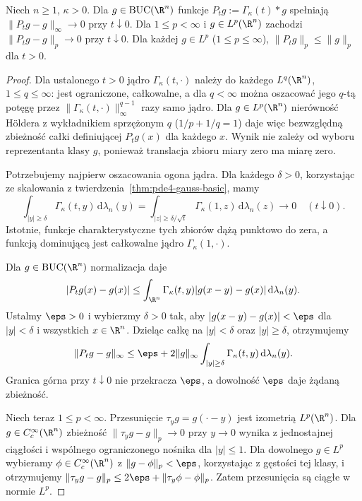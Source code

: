 \begin{twierdzenie}
\label{thm:pde4-approx-identity}
Niech $n\geq1$, $\kappa>0$. Dla $g\in\mathrm{BUC}(\R^n)$
funkcje $P_tg:=\Gamma_\kappa(t)*g$ spełniają
$\|P_tg-g\|_\infty\to0$ przy $t\downarrow0$.
Dla $1\leq p<\infty$ i $g\in L^p(\R^n)$ zachodzi
$\|P_tg-g\|_p\to0$ przy $t\downarrow0$.
Dla każdej $g\in L^p$ ($1\leq p\leq\infty$),
$\|P_tg\|_p\leq\|g\|_p$ dla $t>0$.
\end{twierdzenie}
\begin{proof}
Dla ustalonego $t>0$ jądro $\Gamma_\kappa(t,\cdot)$
należy do każdego $L^q(\R^n)$, $1\leq q\leq\infty$:
jest ograniczone, całkowalne, a dla $q<\infty$
można oszacować jego $q$-tą potęgę przez
$\|\Gamma_\kappa(t,\cdot)\|_\infty^{q-1}$
razy samo jądro. Dla $g\in L^p(\R^n)$
nierówność Höldera z wykładnikiem sprzężonym $q$
($1/p+1/q=1$) daje więc bezwzględną zbieżność
całki definiującej $P_tg(x)$ dla każdego $x$.
Wynik nie zależy od wyboru reprezentanta klasy $g$,
ponieważ translacja zbioru miary zero ma miarę zero.

Potrzebujemy najpierw oszacowania ogona jądra.
Dla każdego $\delta>0$, korzystając ze skalowania
z twierdzenia~\ref{thm:pde4-gauss-basic}, mamy
\[
 \int_{|y|\geq\delta}\Gamma_\kappa(t,y)\,
 \mathrm d\lambda_n(y)
 =\int_{|z|\geq\delta/\sqrt t}\Gamma_\kappa(1,z)\,
 \mathrm d\lambda_n(z)\longrightarrow0
 \quad(t\downarrow0).
\]
Istotnie, funkcje charakterystyczne tych zbiorów
dążą punktowo do zera, a funkcją dominującą
jest całkowalne jądro $\Gamma_\kappa(1,\cdot)$.

Dla $g\in\mathrm{BUC}(\R^n)$ normalizacja daje
\[
 |P_tg(x)-g(x)|\leq
 \int_{\R^n}\Gamma_\kappa(t,y)|g(x-y)-g(x)|
 \,\mathrm d\lambda_n(y).
\]
Ustalmy $\eps>0$ i wybierzmy $\delta>0$ tak,
aby $|g(x-y)-g(x)|<\eps$ dla $|y|<\delta$
i wszystkich $x\in\R^n$. Dzieląc całkę na
$|y|<\delta$ oraz $|y|\geq\delta$, otrzymujemy
\[
 \|P_tg-g\|_\infty\leq\eps+
 2\|g\|_\infty\int_{|y|\geq\delta}\Gamma_\kappa(t,y)
 \,\mathrm d\lambda_n(y).
\]
Granica górna przy $t\downarrow0$ nie przekracza
$\eps$, a dowolność $\eps$ daje żądaną zbieżność.

Niech teraz $1\leq p<\infty$. Przesunięcie
$\tau_yg=g(\cdot-y)$ jest izometrią $L^p(\R^n)$.
Dla $g\in C_c^\infty(\R^n)$ zbieżność
$\|\tau_yg-g\|_p\to0$ przy $y\to0$ wynika
z jednostajnej ciągłości i wspólnego ograniczonego
nośnika dla $|y|\leq1$.
Dla dowolnego $g\in L^p$ wybieramy
$\phi\in C_c^\infty(\R^n)$ z $\|g-\phi\|_p<\eps$,
korzystając z gęstości tej klasy, i otrzymujemy
$\|\tau_yg-g\|_p\leq2\eps+\|\tau_y\phi-\phi\|_p$.
Zatem przesunięcia są ciągłe w normie $L^p$.


\end{proof}
